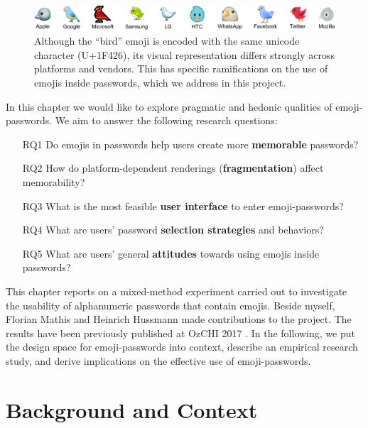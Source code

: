 \begin{figure}
	\centering
	\includegraphics[width=\linewidth]{figures/emojipasswords/emoji-bird-comparison}
	\caption{
		\label{fig:emojipasswords:emoji-bird-comparison}
		Although the ``bird'' emoji is encoded with the same unicode character (U+1F426), its visual representation differs strongly across platforms and vendors. This has specific ramifications on the use of emojis inside passwords, which we address in this project.
	}
\end{figure}

In this chapter we would like to explore pragmatic and hedonic qualities of emoji-passwords. We aim to answer the following research questions:
\begin{itemize}
	\item[RQ1] Do emojis in passwords help users create more \textbf{memorable} passwords?
	\item[RQ2] How do platform-dependent renderings (\textbf{fragmentation}) affect memorability?
	\item[RQ3] What is the most feasible \textbf{user interface} to enter emoji-passwords?
	\item[RQ4] What are users' password \textbf{selection strategies} and behaviors?
	\item[RQ5] What are users' general \textbf{attitudes} towards using emojis inside passwords?
\end{itemize}

This chapter reports on a mixed-method experiment carried out to investigate the usability of alphanumeric passwords that contain emojis. Beside myself, Florian Mathis and Heinrich Hussmann made contributions to the project. The results have been previously published at OzCHI 2017 \cite{Seitz2017Emojipasswords}. In the following, we put the design space for emoji-passwords into context, describe an empirical research study, and derive implications on the effective use of emoji-passwords.

\section{Background and Context}
